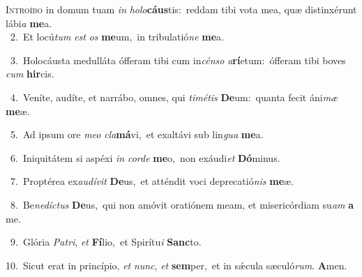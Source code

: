 \lettrine{\initial\textcolor{\initialcolor}{I}}{ntroíbo} in domum tuam \textit{in} \textit{ho}\-\textit{lo}\textbf{cáus}tis:~\star reddam tibi vota mea, quæ distinxérunt lábi\textit{a} \textbf{me}\-a.\\
{\numbfont\textcolor{\numbcolor}{~2.}}~Et locú\textit{tum} \textit{est} \textit{os} \textbf{me}\-um,~\star in tribulatió\textit{ne} \textbf{me}\-a.\par
{\numbfont\textcolor{\numbcolor}{~3.}}~Holocáusta medulláta ófferam tibi cum in\-\textit{cén}\-\textit{so} \textit{a}\-\textbf{rí}etum:~\star ófferam tibi boves \textit{cum} \textbf{hir}\-cis.\par
{\numbfont\textcolor{\numbcolor}{~4.}}~Veníte, audíte, et narrábo, omnes, qui \textit{ti}\-\textit{mé}\textit{tis} \textbf{De}\-um:~\star quanta fecit áni\textit{mæ} \textbf{me}\-æ.\par
{\numbfont\textcolor{\numbcolor}{~5.}}~Ad ipsum ore \textit{me}\-\textit{o} \textit{cla}\-\textbf{má}vi,~\star et exaltávi sub lin\textit{gua} \textbf{me}\-a.\par
{\numbfont\textcolor{\numbcolor}{~6.}}~Iniquitátem si aspéxi \textit{in} \textit{cor}\-\textit{de} \textbf{me}\-o,~\star non exáudi\textit{et} \textbf{Dó}\-minus.\par
{\numbfont\textcolor{\numbcolor}{~7.}}~Proptérea ex\-\textit{au}\-\textit{dí}\textit{vit} \textbf{De}\-us,~\star et atténdit voci deprecatió\textit{nis} \textbf{me}\-æ.\par
{\numbfont\textcolor{\numbcolor}{~8.}}~Be\-\textit{ne}\-\textit{díc}\textit{tus} \textbf{De}\-us,~\star qui non amóvit oratiónem meam, et misericórdiam su\textit{am} \textbf{a} me.\par
{\numbfont\textcolor{\numbcolor}{~9.}}~Glória \textit{Pa}\-\textit{tri}, \textit{et} \textbf{Fí}\-lio,~\star et Spirítu\textit{i} \textbf{Sanc}\-to.\par
{\numbfont\textcolor{\numbcolor}{10.}}~Sicut erat in princípio, \textit{et} \textit{nunc}\-, \textit{et} \textbf{sem}\-per,~\star et in sǽcula sæculó\-\textit{rum}\-. \textbf{A}\-men.\par
